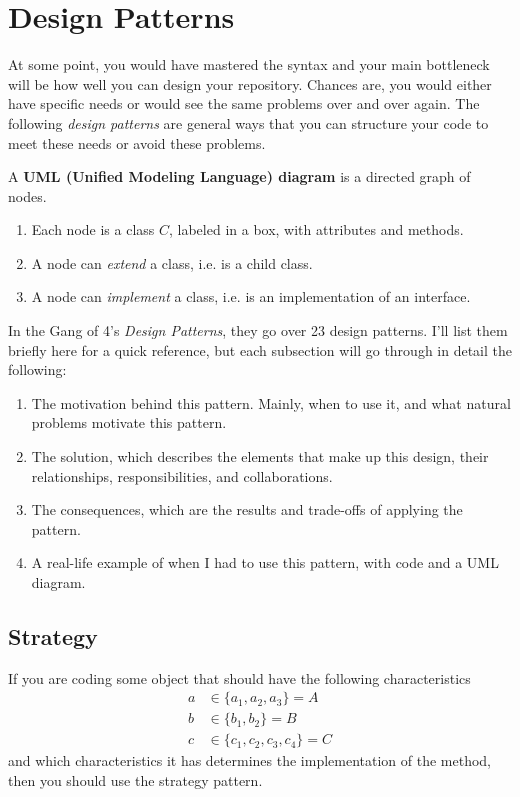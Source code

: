 \section{Design Patterns} 

  At some point, you would have mastered the syntax and your main bottleneck will be how well you can design your repository. Chances are, you would either have specific needs or would see the same problems over and over again. The following \textit{design patterns} are general ways that you can structure your code to meet these needs or avoid these problems. 

  \begin{definition}
    A \textbf{UML (Unified Modeling Language) diagram} is a directed graph of nodes. 
    \begin{enumerate}
      \item Each node is a class $C$, labeled in a box, with attributes and methods. 
      \item A node can \textit{extend} a class, i.e. is a child class. 
      \item A node can \textit{implement} a class, i.e. is an implementation of an interface. 
    \end{enumerate}
  \end{definition} 

  In the Gang of 4's \textit{Design Patterns}, they go over 23 design patterns. I'll list them briefly here for a quick reference, but each subsection will go through in detail the following: 
  \begin{enumerate}
    \item The motivation behind this pattern. Mainly, when to use it, and what natural problems motivate this pattern.  
    \item The solution, which describes the elements that make up this design, their relationships, responsibilities, and collaborations. 
    \item The consequences, which are the results and trade-offs of applying the pattern. 
    \item A real-life example of when I had to use this pattern, with code and a UML diagram. 
  \end{enumerate}

\subsection{Strategy} 

  If you are coding some object that should have the following characteristics 
  \begin{align}
    a & \in \{a_1, a_2, a_3\} = A \\
    b & \in \{b_1, b_2\} = B \\
    c & \in \{c_1, c_2, c_3, c_4\} = C
  \end{align}
  and which characteristics it has determines the implementation of the method, then you should use the strategy pattern.

